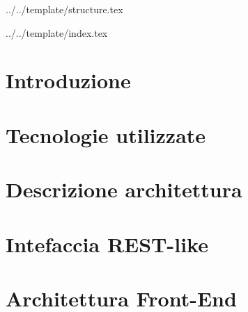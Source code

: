 


\def\DOCUMENTO{Specifica tecnica}
\def\VERSIONE{1.0.0}

\def\DESCRIZIONE{<Info documento}

\def\REDATTORE {<Redattore>}
\def\VERIFICATORE {<Verificatore>}
\def\RESPONSABILE {Carraro Nicola}

\def\USO {Esterno}

\def\DISTRIBUZIONE {\GRUPPO{}\\ & \COMMITTENTE{}\\}

\def\DESCRIZIONE {Specifica tecnica e architettura dell'applicazione Premi}


\def\INDICE	{true}
\def\TABELLE {true}
\def\FIGURE {true}


 {../../template/structure.tex}


 {../../template/index.tex}



\section{Introduzione}


\newpage

\section{Tecnologie utilizzate}


\newpage

\section{Descrizione architettura}


\newpage

\section{Intefaccia REST-like}


\newpage

\section{Architettura Front-End}


